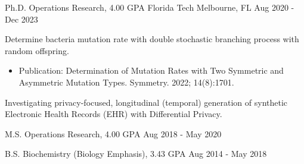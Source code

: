 \vspace{-5mm}
\vspace{-2mm}

\begin{cventries}
	\cventry
	{Ph.D. Operations Research, 4.00 GPA}
	{Florida Tech}
	{Melbourne, FL}
	{Aug 2020 - Dec 2023}
	{\begin{cvitems}
			\item {Determine bacteria mutation rate with double stochastic branching process with random offspring.
			            \begin{itemize}
				            \item {Publication: Determination of Mutation Rates with Two Symmetric and Asymmetric Mutation Types. Symmetry. 2022; 14(8):1701.}
			            \end{itemize}}
			\item {Investigating privacy-focused, longitudinal (temporal) generation of synthetic Electronic Health Records (EHR) with Differential Privacy.}
		\end{cvitems}}

	\vspace{-2mm}

	\cventry
	{M.S. Operations Research, 4.00 GPA}
	{}
	{}
	{Aug 2018 - May 2020}
	{}
	\vspace{-6.5mm}

	\cventry
	{B.S. Biochemistry (Biology Emphasis), 3.43 GPA}
	{}
	{}
	{Aug 2014 - May 2018}
	{}
	\vspace{-6mm}

\end{cventries}